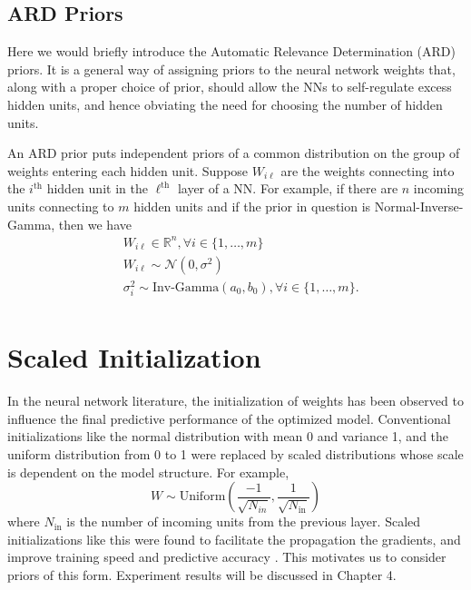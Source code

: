 \documentclass[12pt]{report}
\begin{document}
\subsection{ARD Priors}
Here we would briefly introduce the Automatic Relevance Determination (ARD) priors. It is a general way of assigning priors to the neural network weights that, along with a proper choice of prior, should allow the NNs to self-regulate excess hidden units, and hence obviating the need for choosing the number of hidden units.

An ARD prior puts independent priors of a common distribution on the group of weights entering each hidden unit.
Suppose $W_{i\ell}$ are the weights connecting into the $i^\text{th}$ hidden unit in the $\ell^\text{th}$ layer of a NN. For example, if there are $n$ incoming units connecting to $m$ hidden units and if the prior in question is Normal-Inverse-Gamma, then we have 
\begin{align*}
& W_{i\ell} \in \mathbb{R}^n , \forall i \in \{1,\dots,m\}\\ 
& W_{i\ell} \sim \mathcal{N}(0,\sigma^2) \\
& \sigma_i^2  \sim \text{Inv-Gamma}(a_0,b_0), \forall i \in \{1,\dots,m\} . \\
\end{align*}
\section{Scaled Initialization}
In the neural network literature, the initialization of weights has been observed to influence the final predictive performance of the optimized model. Conventional initializations like the normal distribution with mean 0 and variance 1, and the uniform distribution from 0 to 1 were replaced by scaled distributions whose scale is dependent on the model structure. For example,
\[ W \sim \text{Uniform}(\frac{-1}{\sqrt{N_{in}}},\frac{1}{\sqrt{N_{\text{in}}}}) \]
where $N_\text{in}$ is the number of incoming units from the previous layer. Scaled initializations like this were found to facilitate the propagation the gradients, and improve training speed and predictive accuracy \cite{glorot2010understanding}. This motivates us to consider priors of this form. Experiment results will be discussed in Chapter 4.
\end{document}
